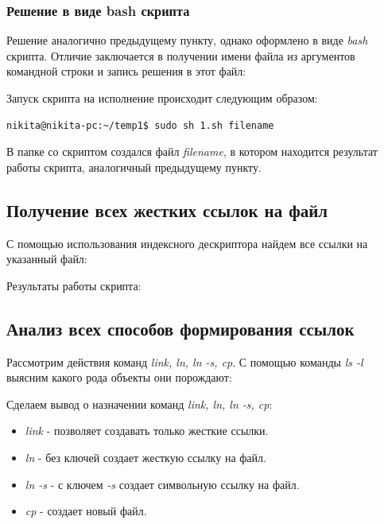 \documentclass[14pt,a4paper,report]{report}
\begin{document}
\subsubsection{Решение в виде bash скрипта}

Решение аналогично предыдущему пункту, однако оформлено в виде \emph{bash} скрипта. Отличие заключается в получении имени файла из аргументов командной строки и запись решения в этот файл:



Запуск скрипта на исполнение происходит следующим образом:

\begin{verbatim}
nikita@nikita-pc:~/temp1$ sudo sh 1.sh filename
\end{verbatim}

В папке со скриптом создался файл \emph{filename}, в котором находится результат работы скрипта, аналогичный предыдущему пункту. 

\subsection{Получение всех жестких ссылок на файл}

С помощью использования индексного дескриптора найдем все ссылки на указанный файл:



Результаты работы скрипта:



\subsection{Анализ всех способов формирования ссылок}

Рассмотрим действия команд \emph{link, ln, ln -s, cp}. С помощью команды \emph{ls -l} выясним какого рода объекты они порождают:



Сделаем вывод о назначении команд \emph{link, ln, ln -s, cp}: 

\begin{itemize}
	\item \emph{link} - позволяет создавать только жесткие ссылки.
	\item \emph{ln} - без ключей создает жесткую ссылку на файл.
	\item \emph{ln -s} - с ключем \emph{-s} создает символьную ссылку на файл.
	\item \emph{cp} - создает новый файл.
\end{itemize}
\end{document}
